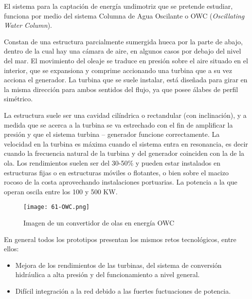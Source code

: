 El sistema para la captación de energía undimotriz que se pretende
estudiar, funciona por medio del sistema Columna de Agua Oscilante o OWC
(\emph{Oscillating Water Column}).

Constan de una estructura parcialmente sumergida hueca por la parte de
abajo, dentro de la cual hay una cámara de aire, en algunos casos por
debajo del nivel del mar. El movimiento del oleaje se traduce en presión
sobre el aire situado en el interior, que se expansiona y comprime
accionando una turbina que a su vez acciona el generador. La turbina que
se suele instalar, está diseñada para girar en la misma dirección para
ambos sentidos del flujo, ya que posee álabes de perfil simétrico.

La estructura suele ser una cavidad cilíndrica o rectandular (con
inclinación), y a medida que se acerca a la turbina se va estrechado con
el fin de amplificar la presión y que el sistema turbina -- generador
funcione correctamente. La velocidad en la turbina es máxima cuando el
sistema entra en resonancia, es decir cuando la frecuencia natural de la
turbina y del generador coinciden con la de la ola. Los rendimientos
suelen ser del 30-50\% y pueden estar instalados en estructuras fijas o
en estructuras móviles o flotantes, o bien sobre el macizo rocoso de la
costa aprovechando instalaciones portuarias. La potencia a la que operan
oscila entre los 100 y 500 KW.

\begin{figure}
\centering
\texttt{[image: 61-OWC.png]}
\caption{Imagen de un convertidor de olas en energía OWC}
\end{figure}

En general todos los prototipos presentan los mismos retos tecnológicos,
entre ellos:

\begin{itemize}
\item
  Mejora de los rendimientos de las turbinas, del sistema de conversión
  hidráulica a alta presión y del funcionamiento a nivel general.
\item
  Difícil integración a la red debido a las fuertes fuctuaciones de
  potencia.
\end{itemize}
